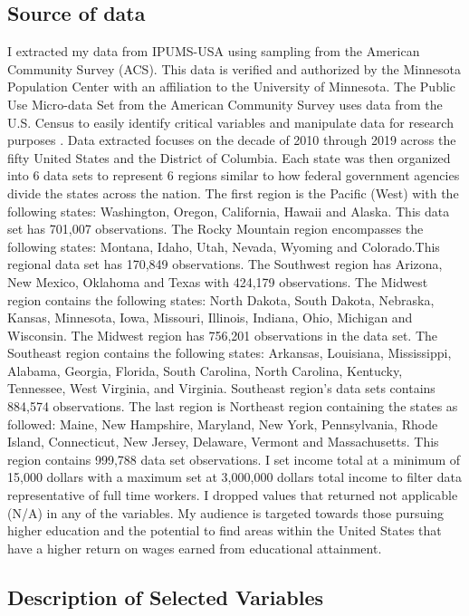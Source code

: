 \documentclass[12pt, English]{article}
\begin{document}
\subsection{Source of data}
I extracted my data from IPUMS-USA using sampling from the American Community Survey (ACS). This data is verified and authorized by the Minnesota Population Center with an affiliation to the University of Minnesota. The Public Use Micro-data Set from the American Community Survey uses data from the U.S. Census to easily identify critical variables and manipulate data for research purposes \citep{IPUMSUSA}. Data extracted focuses on the decade of 2010 through 2019 across the fifty United States and the District of Columbia. Each state was then organized into 6 data sets to represent 6 regions similar to how federal government agencies divide the states across the nation. The first region is the Pacific (West) with the following states: Washington, Oregon, California, Hawaii and Alaska. This data set has  701,007 observations. The Rocky Mountain region encompasses the following states: Montana, Idaho, Utah, Nevada, Wyoming and Colorado.This regional data set has 170,849 observations. The Southwest region has Arizona, New Mexico, Oklahoma and Texas with 424,179 observations. The Midwest region contains the following states: North Dakota, South Dakota, Nebraska, Kansas, Minnesota, Iowa, Missouri, Illinois, Indiana, Ohio, Michigan and Wisconsin. The Midwest region has  756,201  observations in the data set. The Southeast region contains the following states: Arkansas, Louisiana, Mississippi, Alabama, Georgia, Florida, South Carolina, North Carolina, Kentucky, Tennessee, West Virginia, and Virginia. Southeast region's data sets contains 884,574  observations. The last region is Northeast region containing the states as followed: Maine, New Hampshire, Maryland, New York, Pennsylvania, Rhode Island, Connecticut, New Jersey, Delaware, Vermont and Massachusetts. This region contains 999,788 data set observations. I set income total at a minimum of 15,000 dollars with a maximum set at 3,000,000 dollars total income to filter data representative of full time workers. I dropped values that returned not applicable (N/A) in any of the variables. My audience is targeted towards those pursuing higher education and the potential to find areas within the United States that have a higher return on wages earned from educational attainment.  

\subsection{Description of Selected Variables}
\end{document}

